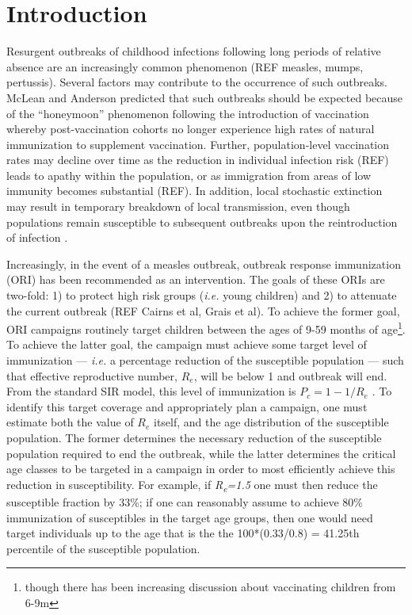 \section{Introduction}\label{introduction}

Resurgent outbreaks of childhood infections following long periods of
relative absence are an increasingly common phenomenon (REF measles,
mumps, pertussis). Several factors may contribute to the occurrence of
such outbreaks. McLean and Anderson \cite{McLean_1988} predicted that such
outbreaks should be expected because of the ``honeymoon'' phenomenon
following the introduction of vaccination whereby post-vaccination
cohorts no longer experience high rates of natural immunization to
supplement vaccination. Further, population-level vaccination rates may
decline over time as the reduction in individual infection risk (REF)
leads to apathy within the population, or as immigration from areas of
low immunity becomes substantial (REF). In addition, local stochastic
extinction may result in temporary breakdown of local transmission, even
though populations remain susceptible to subsequent outbreaks upon the
reintroduction of infection \cite{Ferrari_2008}.

Increasingly, in the event of a measles outbreak, outbreak response
immunization (ORI) has been recommended as an intervention. The goals of
these ORIs are two-fold: 1) to protect high risk groups (\emph{i.e.}
young children) and 2) to attenuate the current outbreak (REF Cairns et
al, Grais et al). To achieve the former goal, ORI campaigns routinely
target children between the ages of 9-59 months of age\footnote{though
  there has been increasing discussion about vaccinating children from
  6-9m}. To achieve the latter goal, the campaign must achieve some
target level of immunization --- \emph{i.e.} a percentage reduction of
the susceptible population --- such that effective reproductive number,
\(R_e\), will be below 1 and outbreak will end. From the standard SIR
model, this level of immunization is \(P_c = 1-1/R_e\) \cite{Anderson_1981}. To identify this target coverage and appropriately plan a campaign, one must estimate
both the value of \(R_e\) itself, and the age distribution of the
susceptible population. The former determines the necessary reduction of
the susceptible population required to end the outbreak, while the
latter determines the critical age classes to be targeted in a campaign
in order to most efficiently achieve this reduction in susceptibility.
For example, if \emph{R\textsubscript{e}=1.5} one must then reduce the
susceptible fraction by 33\%; if one can reasonably assume to achieve
80\% immunization of susceptibles in the target age groups, then one
would need target individuals up to the age that is the the
100*(0.33/0.8) = 41.25th percentile of the susceptible population.

